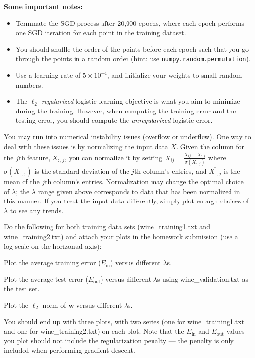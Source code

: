 \documentclass{article}
\newcounter{problem}[section]
\newcounter{subproblem}[problem]
\begin{document}
\textbf{Some important notes:} 
\begin{itemize}
    \item Terminate the SGD process after 20,000 epochs, where each epoch performs one SGD iteration for each point in the training dataset.
    \item You should shuffle the order of the points before each epoch such that you go through the points in a random order (hint: use \texttt{numpy.random.permutation}).
    \item Use a learning rate of $5 \times 10^{-4}$, and initialize your weights to small random numbers. 
    \item The \textit{$\ell_2$-regularized} logistic learning objective is what you aim to minimize during the training. However, when computing the training error and the testing error, you should compute the \textit{unregularized} logistic error. 
\end{itemize}


You may run into numerical instability issues (overflow or underflow). One way to deal with these issues is by normalizing the input data $X$. Given the column for the $j$th feature, $X_{:,j}$, you can normalize it by setting $X_{ij} = \frac{X_{ij} - \overline{X_{:,j}} }{\sigma(X_{:,j})}$ where $\sigma(X_{:,j})$ is the standard deviation of the $j$th column's entries, and $\overline{X_{:,j}}$ is the mean of the $j$th column's entries. Normalization may change the optimal choice of $\lambda$; the $\lambda$ range given above corresponds to data that has been normalized in this manner. If you treat the input data differently, simply plot enough choices of $\lambda$ to see any trends.

\problem[16]
Do the following for both training data sets (wine\_training1.txt and wine\_training2.txt) and attach your plots in the homework submission (use a log-scale on the horizontal axis):

\subproblem Plot the average training error ($E_\text{in}$) versus different $\lambda$s.

\subproblem Plot the average test error ($E_\text{out}$) versus different $\lambda$s using wine\_validation.txt as the test set.

\subproblem Plot the $\ell_2$ norm of $\mathbf{w}$ versus different $\lambda$s. \medskip

 You should end up with three plots, with two series (one for wine\_training1.txt and one for wine\_training2.txt) on each plot. Note that the $E_\text{in}$ and $E_\text{out}$ values you plot should not include the regularization penalty --- the penalty is only included when performing gradient descent.
\end{document}
